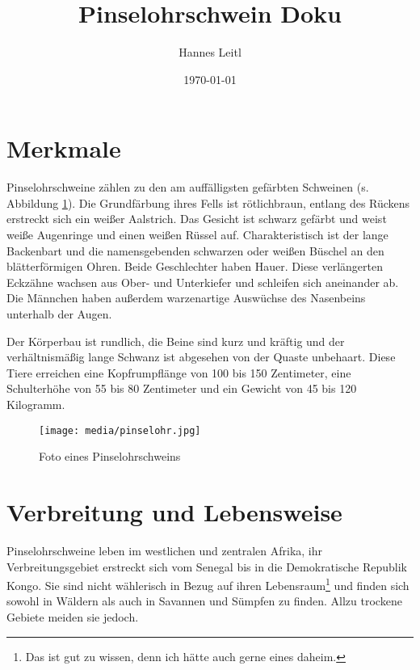 




\title{Pinselohrschwein Doku}
\author{Hannes Leitl}
\date{\today}	%
\maketitle 

\tableofcontents

\section{Merkmale}\label{sec:merkmale} %
Pinselohrschweine zählen zu den am auffälligsten gefärbten Schweinen (s. Abbildung \ref{foto}). Die Grundfärbung ihres Fells ist rötlichbraun, entlang des Rückens erstreckt sich ein weißer Aalstrich. Das Gesicht ist schwarz gefärbt und weist weiße Augenringe und einen weißen Rüssel auf. Charakteristisch ist der lange Backenbart und die namensgebenden schwarzen oder weißen Büschel an den blätterförmigen Ohren. Beide Geschlechter haben Hauer. Diese verlängerten Eckzähne wachsen aus Ober- und Unterkiefer und schleifen sich aneinander ab. Die Männchen haben außerdem warzenartige Auswüchse des Nasenbeins unterhalb der Augen.

Der Körperbau ist rundlich, die Beine sind kurz und kräftig und der verhältnismäßig lange Schwanz ist abgesehen von der Quaste unbehaart. Diese Tiere erreichen eine Kopfrumpflänge von 100 bis 150 Zentimeter, eine Schulterhöhe von 55 bis 80 Zentimeter und ein Gewicht von 45 bis 120 Kilogramm.

\begin{figure}[tbp]
	\centering
	\texttt{[image: media/pinselohr.jpg]}
	\caption{Foto eines Pinselohrschweins}
	\label{foto}
\end{figure}

\section{Verbreitung und Lebensweise}\label{sec:verbreitung_und_lebensweise} %
Pinselohrschweine leben im westlichen und zentralen Afrika, ihr Verbreitungsgebiet erstreckt sich vom Senegal bis in die Demokratische Republik Kongo. Sie sind nicht wählerisch in Bezug auf ihren Lebensraum\footnote{Das ist gut zu wissen, denn ich hätte auch gerne eines daheim.} und finden sich sowohl in Wäldern als auch in Savannen und Sümpfen zu finden. Allzu trockene Gebiete meiden sie jedoch.

